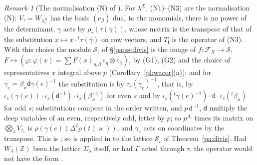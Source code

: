 \documentclass[10pt]{amsart}
\theoremstyle{definition}
\theoremstyle{remark}
\newtheorem{remark}[theorem]{Remark}
\newcommand{\Z}{\mathbb Z}
\providecommand{\auS}{\mathcal S}
\providecommand{\aubar}[1]{\overline{#1}}
\begin{document}
\begin{remark}[The normalisation (N) of {\cite[\S2.7]{P50}}]\label{pl:N}
For $\lambda^X$, (N1)--(N3) are the normalisation (N): $V_\tau=W_{\lambda^X_\tau}$ has the basis
$(e_\beta)$ dual to the monomials, there is no power of the determinant, $\gamma$ acts by
$\rho_\tau(\tau(\aubar\gamma))$, whose matrix is the transpose of that of the substitution
$x\mapsto x\cdot{}^t\tau(\aubar\gamma)$ on row vectors, and $T_{\mathfrak l}$ is the operator of
(N3). With this choice the module $\auS_\iota$ of \S\ref{pa:ss-divis} is the image of
$f\colon\mathcal F_X\to\auS$, $F\mapsto(\varphi\colon\varphi(x)=\sum F(x)_{\eta,\beta}\,e_\eta
\otimes e_\beta)$, by (G1), (G2) and the choice of representatives $x$ integral above $p$
(Corollary~\ref{pl:wacor}(a)); and for $\gamma_e=\beta_\varkappa\mathsf d\gamma(e)^{-1}$ the
substitution is by $\tau_s(\gamma_e)^{-1}$, that is, by $\iota_s(\gamma(e))\cdot\iota_s(\mathsf
d^{-1})\cdot\iota_s(\beta_\varkappa^{-1})$ for even $s$ and by $\iota_s({}^t\gamma(e)^{-1})\cdot
\mathsf d\cdot\iota_s({}^t\beta_\varkappa)$ for odd $s$; substitutions compose in the order
written, and $p\,\mathsf d^{-1}$, $\mathsf d$ multiply the deep variables of an even, respectively
odd, letter by $p$; so $p^{A_{\mathfrak l}}$ times its matrix on $\bigotimes_sV_{\tau_s}$ is
$\rho(\gamma(e))\Delta^2\rho(t(\varkappa))$, and $\gamma_e$ acts on coordinates by the transpose. This is {\cite[(4)]{P50}}; so {\cite[Theorem~2.2]{P50}}
is applied in {\cite[\S2.7]{P50}} to the lattice $\auS_\iota$ of Theorem~\ref{pa:divis}. Had
$W_\lambda(\Z)$ been the lattice $\Sigma_\lambda$ itself, or had $\Gamma$ acted through $\tau$,
the operator would not have the form {\cite[(4)]{P50}}.
\end{remark}
\end{document}
